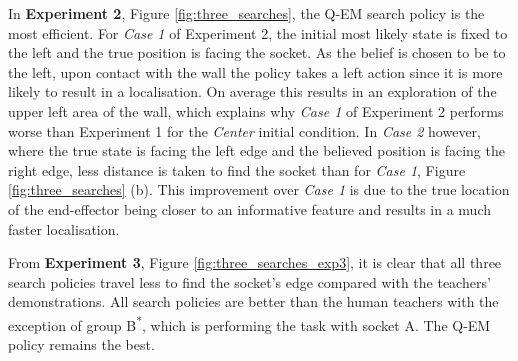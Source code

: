 \documentclass[final,3p,times,twocolumn]{elsarticle}
\begin{document}
In \textbf{Experiment 2}, Figure \ref{fig:three_searches}, the Q-EM search policy is the most efficient. For \textit{Case 1} 
of Experiment 2, the initial most likely state is fixed to the left and the true position is facing the socket. 
As the belief is chosen to be to the left, upon contact with the wall the policy takes a left action since it 
is more likely to result in a localisation. 
On average this results in an exploration of the upper left area of the wall, which explains why \textit{Case 1} of Experiment 2 
performs worse than Experiment 1 for the \textit{Center} initial condition. In \textit{Case 2} however, where the 
true state is facing the left edge and the believed position is facing the right edge, less distance is taken to find the 
socket than for \textit{Case 1}, Figure \ref{fig:three_searches} (b). This improvement over \textit{Case 1} is due to the true location of 
the end-effector being closer to an informative feature and results in a much faster localisation.

From \textbf{Experiment 3}, Figure \ref{fig:three_searches_exp3}, it is clear that all three search policies travel 
less to find the socket's edge compared with the teachers' demonstrations. 
All search policies are better than the human teachers with the exception of group B\textsuperscript{*}, 
which is performing the task with socket A. The Q-EM policy remains the best. 
\end{document}
